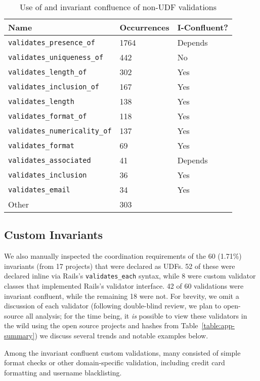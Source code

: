 \begin{table}
\begin{tabular}{|l l l |}
\hline
Name & Occurrences & I-Confluent?\\\hline
\texttt{validates\_presence\_of} & 1764 & Depends\\
\texttt{validates\_uniqueness\_of} & 442 & No \\
\texttt{validates\_length\_of} & 302 & Yes \\
\texttt{validates\_inclusion\_of} & 167 & Yes\\
\texttt{validates\_length} & 138 & Yes \\
\texttt{validates\_format\_of} & 118 & Yes\\
\texttt{validates\_numericality\_of} & 137 & Yes \\
\texttt{validates\_format} & 69 & Yes \\
\texttt{validates\_associated} & 41 & Depends\\
\texttt{validates\_inclusion} & 36 & Yes \\
\texttt{validates\_email} & 34 & Yes \\
Other & 303 & \\\hline
\end{tabular}
\caption{Use of and invariant confluence of non-UDF validations}
\label{table:builtins}
\end{table}

\subsection{Custom Invariants}

We also manually inspected the coordination requirements of the 60
(1.71\%) invariants (from 17 projects) that were declared as UDFs. 52
of these were declared inline via Rails's \texttt{validates\_each}
syntax, while 8 were custom validator classes that implemented Rails's
validator interface. 42 of 60 validations were invariant confluent,
while the remaining 18 were not. For brevity, we omit a discussion of
each validator (following double-blind review, we plan to open-source
all analysis; for the time being, it \textit{is} possible to view
these validators in the wild using the open source projects and hashes
from Table~\ref{table:app-summary}) we discuss several trends and
notable examples below.

Among the invariant confluent custom validations, many consisted of
simple format checks or other domain-specific validation, including
credit card formatting and username blacklisting.

